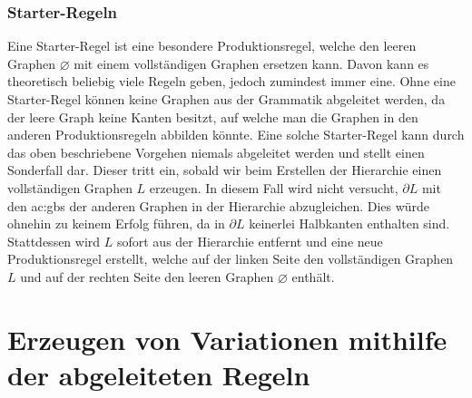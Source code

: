 \subsubsection{Starter-Regeln}
Eine Starter-Regel ist eine besondere Produktionsregel, welche den leeren Graphen \(\varnothing\) mit einem vollständigen Graphen ersetzen kann. Davon
kann es theoretisch beliebig viele Regeln geben, jedoch zumindest immer eine. Ohne eine Starter-Regel können keine Graphen aus der Grammatik abgeleitet werden,
da der leere Graph keine Kanten besitzt, auf welche man die Graphen in den anderen Produktionsregeln abbilden könnte. Eine solche Starter-Regel kann durch
das oben beschriebene Vorgehen niemals abgeleitet werden und stellt einen Sonderfall dar. Dieser tritt ein, sobald wir beim Erstellen der Hierarchie
einen vollständigen Graphen \(L\) erzeugen. In diesem Fall wird nicht versucht, \(\partial L\) mit den \gls{ac:gbs} der anderen Graphen in der Hierarchie
abzugleichen. Dies würde ohnehin zu keinem Erfolg führen, da in \(\partial L\) keinerlei Halbkanten enthalten sind. Stattdessen wird \(L\) sofort aus der
Hierarchie entfernt und eine neue Produktionsregel erstellt, welche auf der linken Seite den vollständigen Graphen \(L\) und auf der rechten Seite den
leeren Graphen \(\varnothing\) enthält.




\section{Erzeugen von Variationen mithilfe der abgeleiteten Regeln}
